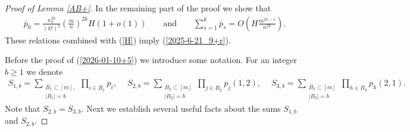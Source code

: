 \documentclass[11pt, a4paper]{article}
\begin{document}
\begin{proof}[ Proof of Lemma \ref{AB+}]
In the remaining part of the proof we show that
\begin{align}
\label{2026-01-10+5}
{\bar p}_0
=
\frac{\kappa_a^{2k}}{(k!)^2}
\left(
\frac{m}{n}
\right)^{2k}
H
\left(
1
+
o(1)
\right)
\qquad
{\text{and}}
\qquad
\sum_{s=1}^k {\bar p}_s
=
O\left(H\frac{m^{2k-1}}{n^{2k}}\right).
\end{align}
These relations combined with (\ref{H}) imply
(\ref{2025-6-21_9+r}).



Before the proof  of
(\ref{2026-01-10+5}) 
we introduce some notation.
For an integer $b\ge 1$ we denote
\begin{align*}
S_{1,b}
=\sum_
{\substack{B_1\subset [m],\\ |B_1|=b}}
\prod_{i\in B_1}
p_i,
\quad
\
S_{2,b}=
\sum_{\substack{B_2\subset [m]\\
|B_2|=b}}
\prod_{j\in B_2}p_j(1,2),
\quad
\
S_{3,b}=
\sum_{\substack{B_3\subset [m]\\
|B_3|=b}}
\prod_{h\in B_3}p_h(2,1).
\end{align*}
Note that $S_{2,b}=S_{3,b}$.
Next we establish several useful facts about the sums $S_{1,b}$ and $S_{2,b}$.


\end{proof}
\end{document}

